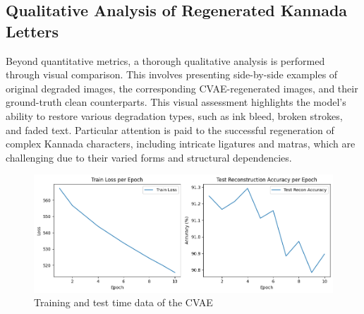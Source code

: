 \documentclass[conference]{IEEEtran}
\begin{document}
\begin{table}[htbp]
    \centering
    \caption{Expected Quantitative Results of Different Regeneration Methods.}
    \label{tab:quantitative_results_updated}
\end{table}

\subsection{Qualitative Analysis of Regenerated Kannada Letters}
\justify
Beyond quantitative metrics, a thorough qualitative analysis is performed through visual comparison. This involves presenting side-by-side examples of original degraded images, the corresponding CVAE-regenerated images, and their ground-truth clean counterparts. This visual assessment highlights the model's ability to restore various degradation types, such as ink bleed, broken strokes, and faded text. Particular attention is paid to the successful regeneration of complex Kannada characters, including intricate ligatures and matras, which are challenging due to their varied forms and structural dependencies.

\begin{figure}[htbp]
    \centering
    \includegraphics[width=\columnwidth]{graphs.png} %
    \caption{Training and test time data of the CVAE}
    \label{fig:single_column_image}
\end{figure}
\end{document}
